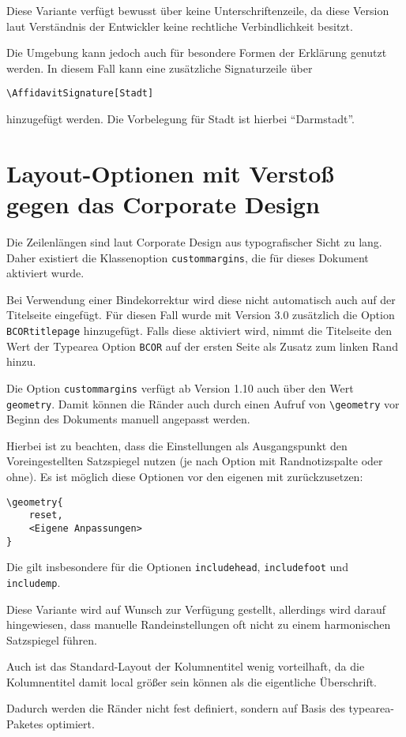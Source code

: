 \documentclass[
	ngerman,
	ruledheaders=section,%
	class=report,%
	thesis={type=bachelor},%
	accentcolor=9c,%
	custommargins=true,%
	marginpar=false,%
	parskip=half-,%
	fontsize=11pt,%
]{tudapub}
\let\code\texttt
\let\tbs\textbackslash
\begin{document}
Diese Variante verfügt bewusst über keine Unterschriftenzeile, da diese Version laut Verständnis der Entwickler keine rechtliche Verbindlichkeit besitzt.

Die Umgebung kann jedoch auch für besondere Formen der Erklärung genutzt werden. In diesem Fall kann eine zusätzliche Signaturzeile über
\begin{verbatim}
\AffidavitSignature[Stadt]
\end{verbatim}
hinzugefügt werden. Die Vorbelegung für Stadt ist hierbei \enquote{Darmstadt}.

\section{Layout-Optionen mit Verstoß gegen das Corporate Design}
Die Zeilenlängen sind laut Corporate Design aus typografischer Sicht zu lang.
Daher existiert die Klassenoption \code{custommargins}, die für dieses Dokument aktiviert wurde.

Bei Verwendung einer Bindekorrektur wird diese nicht automatisch auch auf der Titelseite eingefügt. Für diesen Fall wurde mit Version 3.0 zusätzlich die Option \code{BCORtitlepage} hinzugefügt. Falls diese aktiviert wird, nimmt die Titelseite den Wert der Typearea Option \code{BCOR} auf der ersten Seite als Zusatz zum linken Rand hinzu.

Die Option \code{custommargins} verfügt ab Version 1.10 auch über den Wert \code{geometry}. Damit können die Ränder auch durch einen Aufruf von \code{\tbs{}geometry} vor Beginn des Dokuments manuell angepasst werden.

Hierbei ist zu beachten, dass die Einstellungen als Ausgangspunkt den Voreingestellten Satzspiegel nutzen (je nach Option mit Randnotizspalte oder ohne). Es ist möglich diese Optionen vor den eigenen mit zurückzusetzen:
\begin{verbatim}
\geometry{
	reset,
	<Eigene Anpassungen>
}
\end{verbatim}
Die gilt insbesondere für die Optionen \code{includehead}, \code{includefoot} und \code{includemp}.

Diese Variante wird auf Wunsch zur Verfügung gestellt, allerdings wird darauf hingewiesen, dass manuelle Randeinstellungen oft nicht zu einem harmonischen Satzspiegel führen.

Auch ist das Standard-Layout der Kolumnentitel wenig vorteilhaft, da die Kolumnentitel damit local größer sein können als die eigentliche Überschrift.


Dadurch werden die Ränder nicht fest definiert, sondern auf Basis des typearea-Paketes optimiert.
\end{document}
